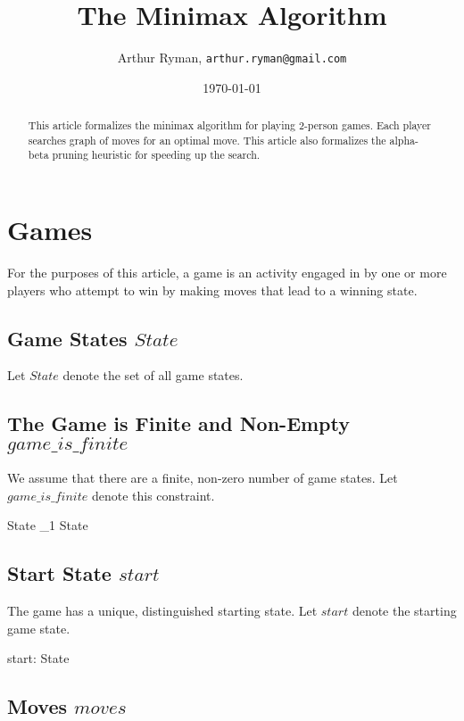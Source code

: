 \documentclass[11pt, oneside]{article}
\title{The Minimax Algorithm}
\author{Arthur Ryman, {\tt arthur.ryman@gmail.com}}
\date{\today}
\begin{document}
\maketitle

\begin{abstract}
This article formalizes the minimax algorithm for playing 2-person games.
Each player searches graph of moves for an optimal move.
This article also formalizes the alpha-beta pruning heuristic for speeding up the search.
\end{abstract}

\section{Games}

For the purposes of this article, a game is an activity engaged in by one or more players
who attempt to win by making moves that lead to a winning state.

\subsection{Game States $State$}

Let $State$ denote the set of all game states.

\begin{zed}
[State]
\end{zed}

\subsection{The Game is Finite and Non-Empty $game\_is\_finite$}

We assume that there are a finite, non-zero number of game states.
Let $game\_is\_finite$ denote this constraint.

\begin{zed}
State \in \finset_1 State
\end{zed}

\subsection{Start State $start$}

The game has a unique, distinguished starting state.
Let $start$ denote the starting game state.

\begin{axdef}
start: State
\end{axdef} 

\subsection{Moves $moves$}
\end{document}
